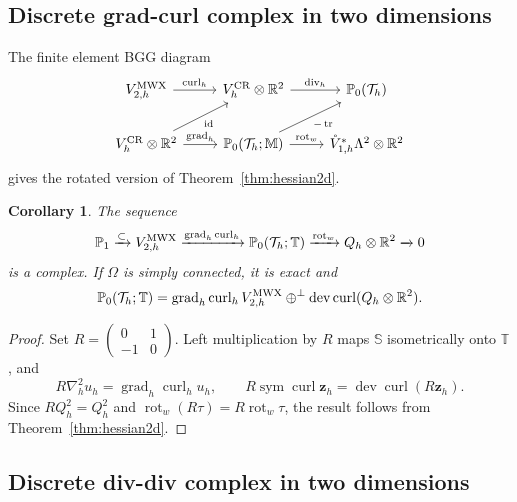 \documentclass[10pt]{amsart}
\numberwithin{equation}{section}
\newtheorem{corollary}[theorem]{Corollary}
\newcommand{\curl}{\operatorname{curl}}
\renewcommand{\div}{\operatorname{div}}
\newcommand{\grad}{\operatorname{grad}}
\newcommand{\tr}{\operatorname{tr}}
\newcommand{\rot}{\operatorname{rot}}
\newcommand{\dev}{\operatorname{dev}}
\newcommand{\sym}{\operatorname{sym}}
\begin{document}
\subsection{Discrete grad-curl complex in two dimensions}
The finite element BGG diagram
\begin{equation*}
\begin{tikzcd}
V_{2,h}^{\rm MWX}
\arrow{r}{\curl_h}
 &
V_{h}^{\rm CR}\otimes\mathbb R^2
   \arrow{r}{\div_h}
 &
\mathbb P_0(\mathcal T_h)
\\
V_{h}^{\rm CR}\otimes\mathbb R^2
 \arrow[ur,swap,"{\rm id}"] \arrow{r}{\grad_h}
 & 
\mathbb P_0(\mathcal T_h;\mathbb M) 
 \arrow[ur,swap,"{\rm -\tr}"] \arrow{r}{\rot_w}
 & \mathring{V}_{1,h}^{*}\Lambda^2\otimes\mathbb R^2
\end{tikzcd}
\end{equation*}
gives the rotated version of Theorem~\ref{thm:hessian2d}.
\begin{corollary}
The sequence
\begin{equation}\label{eq:gradcurlcomplex2dfem}
\mathbb P_1\xrightarrow{\subset} V_{2,h}^{\rm MWX}\xrightarrow{\grad_h\curl_h}\mathbb P_0(\mathcal T_h;\mathbb T)\xrightarrow{\rot_w} Q_h\otimes\mathbb R^2\xrightarrow{}0
\end{equation}
is a complex. If $\Omega$ is simply connected, it is exact and
\begin{equation*}
\mathbb P_0(\mathcal T_h;\mathbb T)
=
\grad_h\curl_h V_{2,h}^{\rm MWX}
\oplus^{\perp}
\dev\curl(Q_h\otimes\mathbb R^2).
\end{equation*}
\end{corollary}
\begin{proof}
Set $R=\left(\begin{smallmatrix}0&1\\-1&0\end{smallmatrix}\right)$.
Left multiplication by $R$ maps $\mathbb S$ isometrically onto $\mathbb T$,
and
\[
R\nabla_h^2u_h=\grad_h\curl_hu_h,\qquad
R\sym\curl\boldsymbol z_h=\dev\curl(R\boldsymbol z_h).
\]
Since $RQ_h^2=Q_h^2$ and $\rot_w(R\tau)=R\rot_w\tau$, the result follows
from Theorem~\ref{thm:hessian2d}.
\end{proof}

\subsection{Discrete div-div complex in two dimensions}
\end{document}
